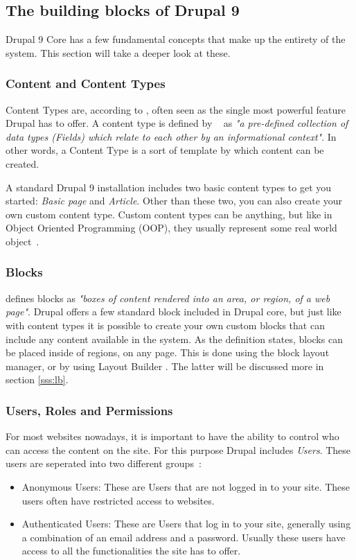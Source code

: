 \subsection{The building blocks of Drupal 9}

Drupal 9 Core has a few fundamental concepts that make up the entirety of the system. This section will take a deeper look at these.

\subsubsection{Content and Content Types}

Content Types are, according to \textcite{Tomlinson2015}, often seen as the single most powerful feature Drupal has to offer. A content type is defined by ~\textcite{Drupal2021} as \emph{"a pre-defined collection of data types (Fields) which relate to each other by an informational context"}. In other words, a Content Type is a sort of template by which content can be created.

A standard Drupal 9 installation includes two basic content types to get you started: \emph{Basic page} and \emph{Article}. Other than these two, you can also create your own custom content type. Custom content types can be anything, but like in Object Oriented Programming (\gls{OOP}), they usually represent some real world object~\autocite{Tomlinson2015}.

\subsubsection{Blocks}
\label{sss:blocks}

\textcite{Drupal2021} defines blocks as \emph{"boxes of content rendered into an area, or region, of a web page"}. Drupal offers a few standard block included in Drupal core, but just like with content types it is possible to create your own custom blocks that can include any content available in the system. As the definition states, blocks can be placed inside of regions, on any page. This is done using the block layout manager, or by using Layout Builder \autocite{Tomlinson2015}. The latter will be discussed more in section \ref{sss:lb}.

\subsubsection{Users, Roles and Permissions}

For most websites nowadays, it is important to have the ability to control who can access the content on the site. For this purpose Drupal includes \emph{Users}. These users are seperated into two different groups~\autocite{Tomlinson2015}:
\begin{itemize}
	\item  Anonymous Users: These are Users that are not logged in to your site. These users often have restricted access to websites.
	\item  Authenticated Users: These are Users that log in to your site, generally using a combination of an email address and a password. Usually these users have access to all the functionalities the site has to offer.
\end{itemize}

